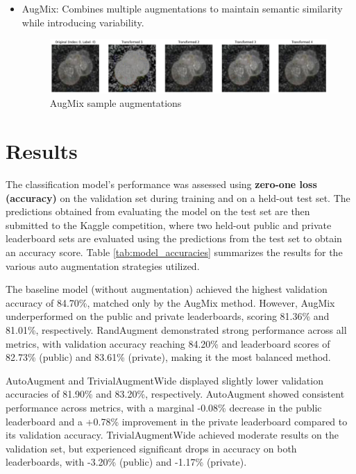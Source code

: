 \documentclass[letterpaper]{article}
\begin{document}
\begin{itemize}
            \item AugMix: Combines multiple augmentations to maintain semantic similarity while introducing variability.

            \begin{figure}[H]
                \centering
                \includegraphics[width=1\linewidth]{Figure4-AugMix.png}
                \caption{AugMix sample augmentations}
                \label{fig:augmix}
            \end{figure}
        \end{itemize}

\section{Results}

    The classification model's performance was assessed using \textbf{zero-one loss (accuracy)} on the validation set during training and on a held-out test set. The predictions obtained from evaluating the model on the test set are then submitted to the Kaggle competition, where two held-out public and private leaderboard sets are evaluated using the predictions from the test set to obtain an accuracy score. Table \ref{tab:model_accuracies} summarizes the results for the various auto augmentation strategies utilized.
    
    The baseline model (without augmentation) achieved the highest validation accuracy of 84.70\%, matched only by the AugMix method. However, AugMix underperformed on the public and private leaderboards, scoring 81.36\% and 81.01\%, respectively. RandAugment demonstrated strong performance across all metrics, with validation accuracy reaching 84.20\% and leaderboard scores of 82.73\% (public) and 83.61\% (private), making it the most balanced method.

    AutoAugment and TrivialAugmentWide displayed slightly lower validation accuracies of 81.90\% and 83.20\%, respectively. AutoAugment showed consistent performance across metrics, with a marginal -0.08\% decrease in the public leaderboard and a +0.78\% improvement in the private leaderboard compared to its validation accuracy. TrivialAugmentWide achieved moderate results on the validation set, but experienced significant drops in accuracy on both leaderboards, with -3.20\% (public) and -1.17\% (private).
\end{document}
